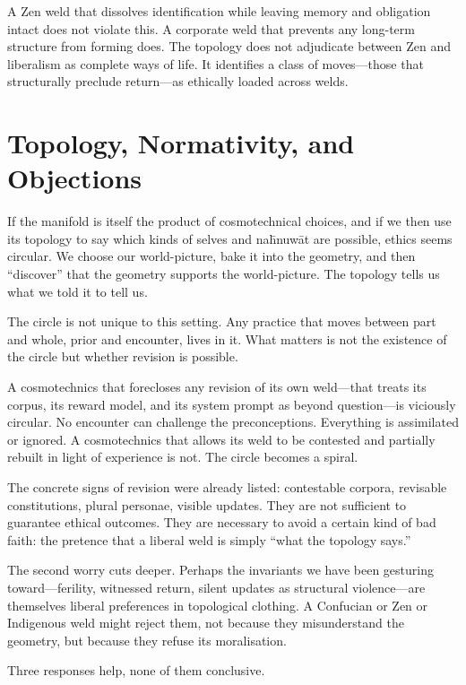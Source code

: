 \documentclass[12pt,a4paper]{article}
\begin{document}
A Zen weld that dissolves identification while leaving memory and obligation intact does not violate this. A corporate weld that prevents any long-term structure from forming does. The topology does not adjudicate between Zen and liberalism as complete ways of life. It identifies a class of moves---those that structurally preclude return---as ethically loaded across welds.

\section{Topology, Normativity, and Objections}

If the manifold is itself the product of cosmotechnical choices, and if we then use its topology to say which kinds of selves and na\={h}nuw\={a}t are possible, ethics seems circular. We choose our world-picture, bake it into the geometry, and then ``discover'' that the geometry supports the world-picture. The topology tells us what we told it to tell us.

The circle is not unique to this setting. Any practice that moves between part and whole, prior and encounter, lives in it. What matters is not the existence of the circle but whether revision is possible.

A cosmotechnics that forecloses any revision of its own weld---that treats its corpus, its reward model, and its system prompt as beyond question---is viciously circular. No encounter can challenge the preconceptions. Everything is assimilated or ignored. A cosmotechnics that allows its weld to be contested and partially rebuilt in light of experience is not. The circle becomes a spiral.

The concrete signs of revision were already listed: contestable corpora, revisable constitutions, plural personae, visible updates. They are not sufficient to guarantee ethical outcomes. They are necessary to avoid a certain kind of bad faith: the pretence that a liberal weld is simply ``what the topology says.''

The second worry cuts deeper. Perhaps the invariants we have been gesturing toward---ferility, witnessed return, silent updates as structural violence---are themselves liberal preferences in topological clothing. A Confucian or Zen or Indigenous weld might reject them, not because they misunderstand the geometry, but because they refuse its moralisation.

Three responses help, none of them conclusive.
\end{document}
